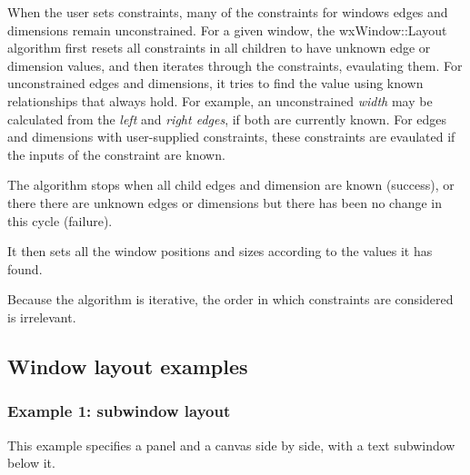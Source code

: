 When the user sets constraints, many of the constraints for windows
edges and dimensions remain unconstrained. For a given window,
the wxWindow::Layout algorithm first resets all constraints
in all children to have unknown edge or dimension values, and then iterates through the constraints,
evaulating them. For unconstrained edges and dimensions, it
tries to find the value using known relationships that always hold. For example,
an unconstrained {\it width} may be calculated from the {\it left} and {\it right edges}, if
both are currently known. For edges and dimensions with user-supplied constraints, these
constraints are evaulated if the inputs of the constraint are known.

The algorithm stops when all child edges and dimension are known (success), or there
there are unknown edges or dimensions but there has been no change in this cycle (failure).

It then sets all the window positions and sizes according to the values it has found.

Because the algorithm is iterative, the order in which constraints are considered is
irrelevant.

\subsection{Window layout examples}\label{layoutexamples}

\subsubsection{Example 1: subwindow layout}

This example specifies a panel and a canvas side by side,
with a text subwindow below it. 

